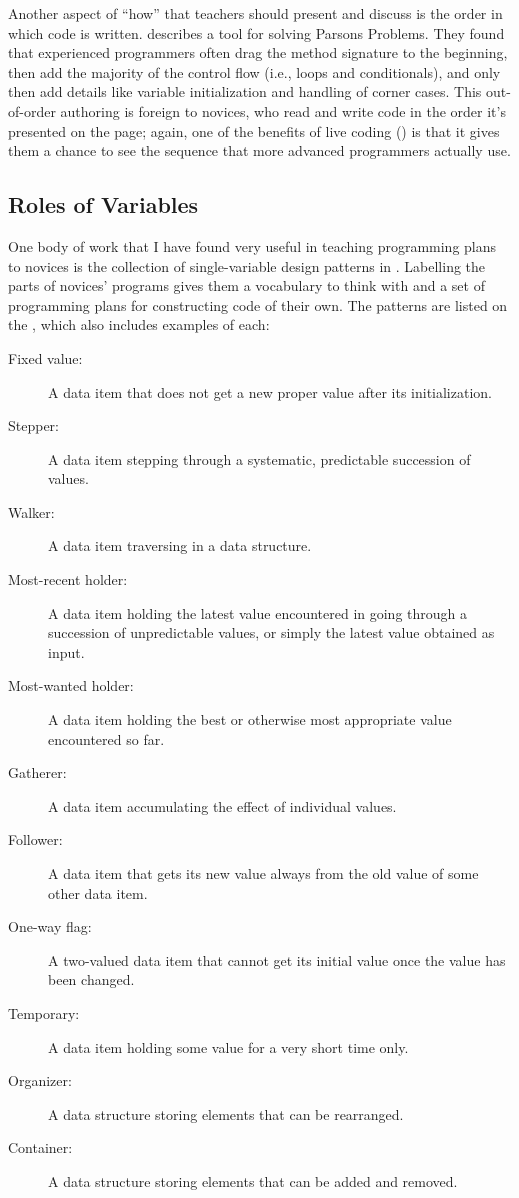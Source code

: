 Another aspect of ``how'' that teachers should present and discuss is the
order in which code is written. \cite{Ihan2011} describes a tool for
solving Parsons Problems. They found that experienced programmers often
drag the method signature to the beginning, then add the majority of the
control flow (i.e., loops and conditionals), and only then add details
like variable initialization and handling of corner cases. This
out-of-order authoring is foreign to novices, who read and write code in
the order it's presented on the page; again, one of the benefits of live
coding () is that it gives them a chance
to see the sequence that more advanced programmers actually use.

\subsection*{Roles of Variables}

One body of work that I have found very useful in teaching programming
plans to novices is the collection of single-variable design patterns
in \cite{Kuit2004,Byck2005,Saja2006}. Labelling
the parts of novices' programs gives them a vocabulary to think with
and a set of programming plans for constructing code of their own. The
patterns are listed on the , which also includes examples of each:

\begin{description}
\item[Fixed value:]
A data item that does not get a new proper value after its
initialization.
\item[Stepper:]
A data item stepping through a systematic, predictable succession of
values.
\item[Walker:]
A data item traversing in a data structure.
\item[Most-recent holder:]
A data item holding the latest value encountered in going through a
succession of unpredictable values, or simply the latest value
obtained as input.
\item[Most-wanted holder:]
A data item holding the best or otherwise most appropriate value
encountered so far.
\item[Gatherer:]
A data item accumulating the effect of individual values.
\item[Follower:]
A data item that gets its new value always from the old value of
some other data item.
\item[One-way flag:]
A two-valued data item that cannot get its initial value once the
value has been changed.
\item[Temporary:]
A data item holding some value for a very short time only.
\item[Organizer:]
A data structure storing elements that can be rearranged.
\item[Container:]
A data structure storing elements that can be added and removed.
\end{description}

